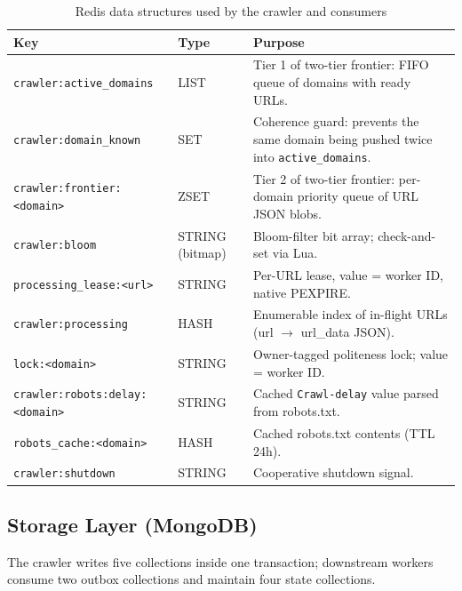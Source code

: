 \documentclass[11pt,a4paper]{article}
\newcommand{\code}[1]{\texttt{#1}}
\begin{document}
\begin{table}[H]
\centering
\caption{Redis data structures used by the crawler and consumers}
\begin{tabular}{p{}p{}p{}}
\toprule
Key & Type & Purpose \\
\midrule
\code{crawler:active\_domains} & LIST & Tier 1 of two-tier frontier: FIFO queue of domains with ready URLs.\\
\code{crawler:domain\_known} & SET & Coherence guard: prevents the same domain being pushed twice into \code{active\_domains}.\\
\code{crawler:frontier:<domain>} & ZSET & Tier 2 of two-tier frontier: per-domain priority queue of URL JSON blobs.\\
\code{crawler:bloom} & STRING (bitmap) & Bloom-filter bit array; check-and-set via Lua.\\
\code{processing\_lease:<url>} & STRING & Per-URL lease, value = worker ID, native PEXPIRE.\\
\code{crawler:processing} & HASH & Enumerable index of in-flight URLs (url $\to$ url\_data JSON).\\
\code{lock:<domain>} & STRING & Owner-tagged politeness lock; value = worker ID.\\
\code{crawler:robots:delay:<domain>} & STRING & Cached \code{Crawl-delay} value parsed from robots.txt.\\
\code{robots\_cache:<domain>} & HASH & Cached robots.txt contents (TTL 24h).\\
\code{crawler:shutdown} & STRING & Cooperative shutdown signal.\\
\bottomrule
\end{tabular}
\end{table}

\subsection{Storage Layer (MongoDB)}

The crawler writes five collections inside one transaction; downstream workers consume two outbox collections and maintain four state collections.
\end{document}
